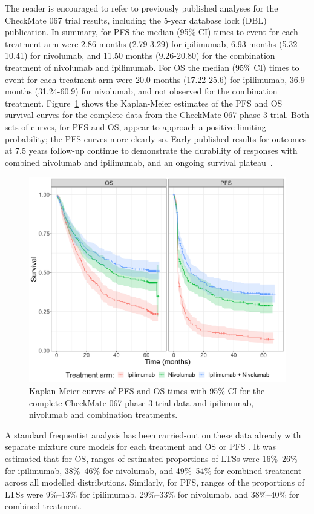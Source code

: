\documentclass[AMA,STIX1COL]{WileyNJD-v2}
\begin{document}
The reader is encouraged to refer to previously published analyses for the CheckMate 067 trial results, including the 5-year database lock (DBL) publication\cite{Larkin2019}. In summary, for PFS the median (95\% CI) times to event for each treatment arm were 2.86 months (2.79-3.29) for ipilimumab, 6.93 months (5.32-10.41) for nivolumab, and 11.50 months (9.26-20.80) for the combination treatment of nivolumab and ipilimumab. For OS the median (95\% CI) times to event for each treatment arm were 20.0 months (17.22-25.6) for ipilimumab, 36.9 months (31.24-60.9) for nivolumab, and not observed for the combination treatment.
Figure~\ref{fig:S_raw_data} shows the Kaplan-Meier estimates of the PFS and OS survival curves for the complete data from the CheckMate 067 phase 3 trial. Both sets of curves, for PFS and OS, appear to approach a positive limiting probability; the PFS curves more clearly so. Early published results for outcomes at 7.5 years follow-up continue to demonstrate the durability of responses with combined nivolumab and ipilimumab, and an ongoing survival plateau~\cite{Hodi2022}.

\begin{figure}[!ht]
\centering
\includegraphics[width=0.6\linewidth]{km_raw_data.png}
\caption{\label{fig:S_raw_data} Kaplan-Meier curves of PFS and OS times with 95\% CI for the complete CheckMate 067 phase 3 trial data and ipilimumab, nivolumab and combination treatments.}
\end{figure}

A standard frequentist analysis has been carried-out on these data already with separate mixture cure models for each treatment and OS or PFS \cite{Mohr2020}.
It was estimated that for OS, ranges of estimated proportions of LTSs were 16\%–26\% for ipilimumab, 38\%–46\% for nivolumab, and 49\%–54\% for combined treatment across all modelled distributions.
Similarly, for PFS, ranges of the proportions of LTSs were 9\%–13\% for ipilimumab, 29\%–33\% for nivolumab, and 38\%–40\% for combined treatment.
\end{document}

